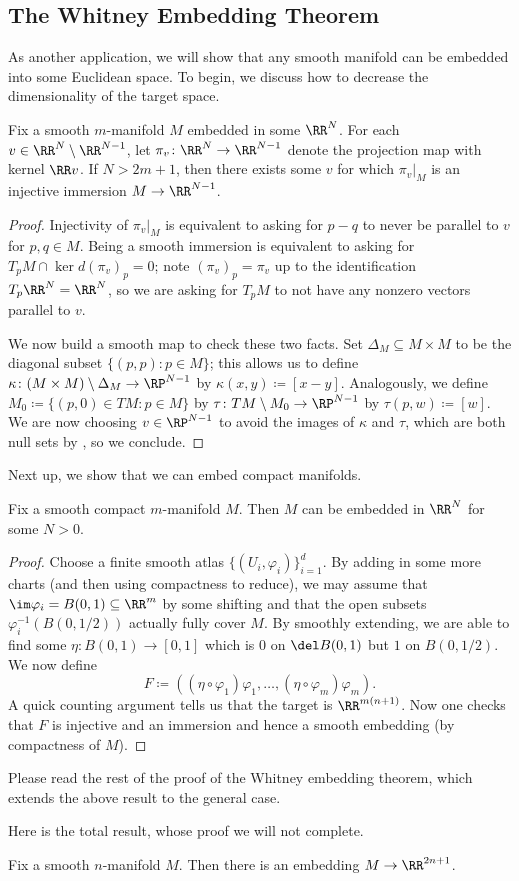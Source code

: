 \documentclass[../notes.tex]{subfiles}
\begin{document}
\subsection{The Whitney Embedding Theorem}
As another application, we will show that any smooth manifold can be embedded into some Euclidean space. To begin, we discuss how to decrease the dimensionality of the target space.
\begin{lemma}
	Fix a smooth $m$-manifold $M$ embedded in some $\RR^N$. For each $v\in\RR^N\setminus\RR^{N-1}$, let $\pi_v\colon\RR^N\to\RR^{N-1}$ denote the projection map with kernel $\RR v$. If $N>2m+1$, then there exists some $v$ for which $\pi_v|_M$ is an injective immersion $M\to\RR^{N-1}$.
\end{lemma}
\begin{proof}
	Injectivity of $\pi_v|_M$ is equivalent to asking for $p-q$ to never be parallel to $v$ for $p,q\in M$. Being a smooth immersion is equivalent to asking for $T_pM\cap\ker d(\pi_v)_p=0$; note $(\pi_v)_p=\pi_v$ up to the identification $T_p\RR^N=\RR^N$, so we are asking for $T_pM$ to not have any nonzero vectors parallel to $v$.

	We now build a smooth map to check these two facts. Set $\Delta_M\subseteq M\times M$ to be the diagonal subset $\{(p,p):p\in M\}$; this allows us to define $\kappa\colon(M\times M)\setminus\Delta_M\to\RP^{N-1}$ by $\kappa(x,y)\coloneqq[x-y]$. Analogously, we define $M_0\coloneqq\{(p,0)\in TM:p\in M\}$ by $\tau\colon TM\setminus M_0\to\RP^{N-1}$ by $\tau(p,w)\coloneqq[w]$. We are now choosing $v\in\RP^{N-1}$ to avoid the images of $\kappa$ and $\tau$, which are both null sets by , so we conclude.
\end{proof}
Next up, we show that we can embed compact manifolds.
\begin{lemma}
	Fix a smooth compact $m$-manifold $M$. Then $M$ can be embedded in $\RR^N$ for some $N>0$.
\end{lemma}
\begin{proof}
	Choose a finite smooth atlas $\{(U_i,\varphi_i)\}_{i=1}^d$. By adding in some more charts (and then using compactness to reduce), we may assume that $\im\varphi_i=B(0,1)\subseteq\RR^m$ by some shifting and that the open subsets $\varphi_i^{-1}(B(0,1/2))$ actually fully cover $M$. By smoothly extending, we are able to find some $\eta\colon B(0,1)\to[0,1]$ which is $0$ on $\del B(0,1)$ but $1$ on $B(0,1/2)$. We now define
	\[F\coloneqq((\eta\circ\varphi_1)\varphi_1,\ldots,(\eta\circ\varphi_m)\varphi_m).\]
	A quick counting argument tells us that the target is $\RR^{m(n+1)}$. Now one checks that $F$ is injective and an immersion and hence a smooth embedding (by compactness of $M$).
\end{proof}
\begin{remark}
	Please read the rest of the proof of the Whitney embedding theorem, which extends the above result to the general case.
\end{remark}
Here is the total result, whose proof we will not complete.
\begin{theorem} \label{thm:whitney-embed}
	Fix a smooth $n$-manifold $M$. Then there is an embedding $M\to\RR^{2n+1}$.
\end{theorem}
\end{document}
